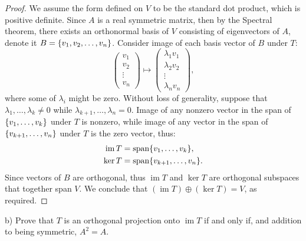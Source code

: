 \documentclass{article}
\theoremstyle{definition}
\DeclareMathOperator{\im}{\operatorname{im}}
\DeclareMathOperator{\spn}{\operatorname{span}}
\DeclarePairedDelimiter\set{\{}{\}}
\begin{document}
\begin{proof}

We assume the form defined on $V$ to be the standard dot product, which is positive definite.
Since $A$ is a real symmetric matrix, then by the Spectral theorem, there exists an orthonormal basis of $V$ consisting of eigenvectors of $A$, denote it $B = \set{v_1, v_2, \dots, v_n}$.
Consider image of each basis vector of $B$ under $T$:
\[
	\begin{pmatrix}
		v_1 \\
		v_2 \\
		\vdots \\
		v_n
	\end{pmatrix}
	\longmapsto
	\begin{pmatrix}
		\lambda_1 v_1 \\
		\lambda_2 v_2 \\
		\vdots \\
		\lambda_n v_n
	\end{pmatrix},
\]
where some of $\lambda_i$ might be zero.
Without loss of generality, suppose that $\lambda_1, \dots, \lambda_k \neq 0$ while $\lambda_{k+1}, \dots, \lambda_n = 0$.
Image of any nonzero vector in the span of $\set{v_1, \dots, v_k}$ under $T$ is nonzero, while image of any vector in the span of $\set{v_{k+1}, \dots, v_n}$ under $T$ is the zero vector, thus:
\begin{align*}
	\im T & = \spn \set{v_1, \dots, v_k}, \\
	\ker T & = \spn \set{v_{k+1}, \dots, v_n}.
\end{align*}
Since vectors of $B$ are orthogonal, thus $\im T$ and $\ker T$ are orthogonal subspaces that together span $V$.
We conclude that $(\im T) \oplus (\ker T) = V$, as required.

\end{proof}

\begin{tcolorbox}
b) Prove that $T$ is an orthogonal projection onto $\im T$ if and only if, and addition to being symmetric, $A^2=A$.
\end{tcolorbox}
\end{document}
